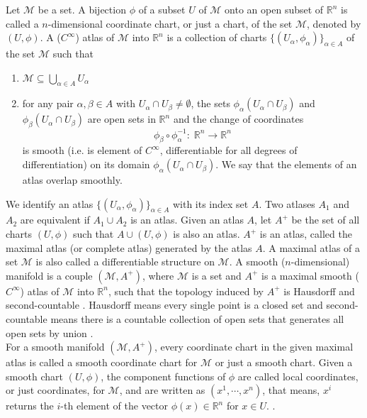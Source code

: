Let $\mathcal{M}$ be a set. A bijection $\phi$ of a subset $U$ of $\mathcal{M}$ onto an open subset of $\mathbb{R}^n$ is called a $n$-dimensional coordinate chart, or just a chart, of the set $\mathcal{M}$, denoted by $(U, \phi)$. A ($C^{\infty}$) atlas of $\mathcal{M}$ into $\mathbb{R}^n$ is a collection of charts $\{ (U_{\alpha}, \phi_{\alpha}) \}_{\alpha \in A}$ of the set $\mathcal{M}$ such that
\begin{enumerate}
    \item $\mathcal{M} \subseteq \bigcup_{\alpha \in A} U_{\alpha}$
    \item for any pair $\alpha, \beta \in A$ with $U_{\alpha} \cap U_{\beta} \neq \emptyset$, the sets $\phi_{\alpha}(U_{\alpha} \cap U_{\beta})$ and $\phi_{\beta}(U_{\alpha} \cap U_{\beta})$ are open sets in $\mathbb{R}^n$ and the change of coordinates \begin{equation*}
     \phi_{\beta} \circ \phi_{\alpha}^{-1} \colon \; \mathbb{R}^n \to \mathbb{R}^n \end{equation*} is smooth (i.e. is element of $C^{\infty}$, differentiable for all degrees of differentiation) on its domain $\phi_{\alpha}(U_{\alpha} \cap U_{\beta})$. We say that the elements
    of an atlas overlap smoothly.
\end{enumerate}
We identify an atlas $\{ (U_{\alpha}, \phi_{\alpha}) \}_{\alpha \in A}$ with its index set $A$. Two atlases $A_1$ and $A_2$ are equivalent if $A_1 \cup A_2$ is an atlas. Given an atlas $A$, let $A^{+}$ be the set of all charts $(U, \phi)$ such that $A \cup (U, \phi)$ is also an atlas. $A^{+}$ is an atlas, called the maximal atlas (or complete atlas) generated by the atlas $A$. A maximal atlas of a set $\mathcal{M}$ is also called a differentiable structure on $\mathcal{M}$. A smooth ($n$-dimensional) manifold is a couple $(\mathcal{M}, A^{+})$, where $\mathcal{M}$ is a set and $A^{+}$ is a maximal smooth ($C^{\infty}$) atlas of $\mathcal{M}$ into $\mathbb{R}^n$, such that the topology induced by $A^{+}$ is Hausdorff and second-countable \cite[18-20]{AbsilMahonySepulchre:2008}. Hausdorff means every single point is a closed set and second-countable means there is a countable collection of open sets that generates all open sets by union \cite[p.~4]{Huang:2013}. \\
For a smooth manifold $(\mathcal{M}, A^{+})$, every coordinate chart in the given maximal atlas is called a smooth coordinate chart for $\mathcal{M}$ or just a smooth chart. Given a smooth chart $(U, \phi)$, the component functions of $\phi$ are called local coordinates, or just coordinates, for $\mathcal{M}$, and are written as $(x^1, \cdots, x^n)$, that means, $x^i$ returns the $i$-th element of the vector $\phi(x) \in \mathbb{R}^n$ for $x \in U$. \cite[p.~374-375]{Lee:2019}. \\
